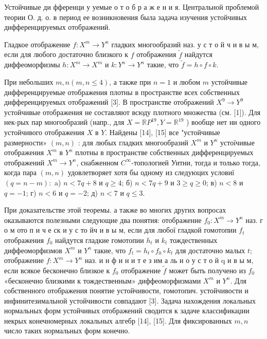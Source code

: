 \documentclass[10pt]{article}
\begin{document}
Устойчивые ди фференци у уемые о т о б р а ж е н и я. Центральной проблемой теории О. д. о. в период ее возникновения была задача изучения устойчивых дифференцируемых отображений.



Гладкое отображение $f: X^{m} \rightarrow Y^{n}$ гладких многообразий наз. у с т о й ч и в ы м, если для любого достаточно близкого к $f$ отображения $\tilde{f}$ найдутся диффеоморфизмы $h: X^{m} \rightarrow X^{m}$ и $k: Y^{n} \rightarrow Y^{n}$ такие, что $\tilde{f}=h \circ f \circ k$.



При небольших $m, n(m, n \leqslant 4)$, а также при $n=1$ и любом $m$ устойчивые дифференцируемые отображения плотны в пространстве всех собственных дифференцируемых отображений [3]. В пространстве отображений $X^{9} \rightarrow Y^{9}$ устойчивые отображения не составляют всюду плотного множества (см. [1]). Для нек-рых пар многообразий (напр., для $X=\mathbb{R} P^{19}, Y=\mathbb{R}^{19}$ ) вообще нет ни одного устойчивого отображения $X$ в $Y$. Найдены [14], [15] все "устойчивые размерности» $(m, n)$ : для любых гладких многообразий $X^{m}$ и $Y^{n}$ устоїчивые отображения $X^{m}$ в $Y^{n}$ плотны в пространстве собственных дифференцируемых отображений $X^{m} \rightarrow Y^{n}$, снабженном $C^{\infty}$-топологией Уитни, тогда и только тогда, когда пара $(m, n)$ удовлетворяет хотя бы одному из следуюцих условиї $(q=n-m):$ a) $n<7 q+8$ и $q \geqslant 4$; б) $n<7 q+9$ и $3 \geqslant q \geqslant 0$; в) $n<8$ и $q=-1$; г) $n<6$ и $q=-2$; д) $n<7$ и $q \leqslant 3$.



При доказательстве этой теоремы. а также во многих других вопросах оказываются полезными следующие два понятия: отображение $f_{0}: X^{m} \rightarrow Y^{n}$ наз. г о м ото п и ч е ск и у с то йч и в ы м, если для любої гладкой гомотопии $f_{t}$ отображения $f_{0}$ найдутся гладкие гомотопии $h_{t}$ и $k_{t}$ тождественных диффеоморфизмов $X^{m}$ и $Y^{n}$ такие, что $f_{t}=h_{t} \circ f_{0} \circ k_{t}$ для достаточно малых $t$; отображение $f: X^{m} \rightarrow Y^{n}$ наз. и н ф и н и т е з им а ль н о у с т о й q и в ы м, если всякое бесконечно близкое к $f_{0}$ отображение $\tilde{f}$ может быть получено из $f_{0}$ «бесконечно близкими к тождественным» диффеоморфизмами $X^{m}$ и $Y^{n}$. Для собственного отображения понятие устойчивости, гомотопич. устойчивости и инфинитезимальной устойчивости совпадают [3]. Задача нахождения локальных нормальных форм устойчивых отображений сводится к задаче классификаџии некрых конечномерных локальных алгебр [14], [15]. Для фиксированных $m, n$ число таких нормальных форм конечно.
\end{document}
